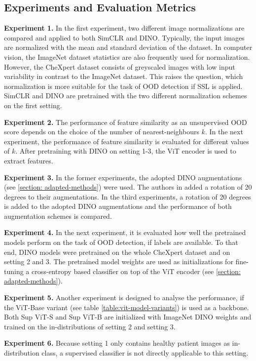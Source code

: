 \subsection{Experiments and Evaluation Metrics}
\textbf{Experiment 1.} In the first experiment, two different image normalizations are compared and applied to both SimCLR and DINO.
Typically, the input images are normalized with the mean and standard deviation of the dataset.
In computer vision, the ImageNet dataset statistics \citep{Deng2009} are also frequently used for normalization.
However, the CheXpert dataset consists of greyscaled images with low input variability in contrast to the ImageNet dataset.
This raises the question, which normalization is more suitable for the task of OOD detection if SSL is applied.
SimCLR and DINO are pretrained with the two different normalization schemes on the first setting.
\par
\textbf{Experiment 2.} The performance of feature similarity as an unsupervised OOD score depends on the choice of the number of nearest-neighbours $k$.
In the next experiment, the performance of feature similarity is evaluated for different values of $k$.
After pretraining with DINO on setting 1-3, the ViT encoder is used to extract features.
\par
\textbf{Experiment 3.}
In the former experiments, the adopted DINO augmentations (see \ref{section: adapted-methods}) were used.
The authors in \citep{Azizi2021} added a rotation of 20 degrees to their augmentations.
In the third experiments, a rotation of 20 degrees is added to the adopted DINO augmentations and the performance of both augmentation schemes is compared.
\par
\textbf{Experiment 4.}
In the next experiment, it is evaluated how well the pretrained models perform on the task of OOD detection, if labels are available.
To that end, DINO models were pretrained on the whole CheXpert dataset and on setting 2 and 3.
The pretrained model weights are used as initializations for fine-tuning a cross-entropy based classifier on top of the ViT encoder (see \ref{section: adapted-methods}).
\par
\textbf{Experiment 5.}
Another experiment is designed to analyse the performance, if the ViT-Base variant (see table \ref{table:vit-model-variants}) is used as a backbone.
Both Sup ViT-S and Sup ViT-B are initialized with ImageNet DINO weights and trained on the in-distributions of setting 2 and setting 3.
\par
\textbf{Experiment 6.}
Because setting 1 only contains healthy patient images as in-distribution class, a supervised classifier is not directly applicable to this setting.
